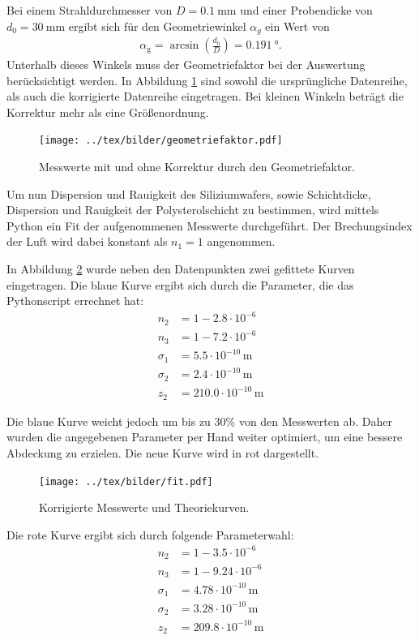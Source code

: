 Bei einem Strahldurchmesser von $D = \SI{0.1}{\milli\meter}$ und einer Probendicke von $d_0 = \SI{30}{\milli\meter}$ ergibt sich für den Geometriewinkel $\alpha_g$ ein Wert von
\begin{align}
	\alpha_\text{g} = \arcsin\left(\frac{d_0}{D}\right) = \SI{0.191}{\degree}.
\end{align}
Unterhalb dieses Winkels muss der Geometriefaktor bei der Auswertung berücksichtigt werden. In Abbildung \ref{pic:geometrie} sind sowohl die ursprüngliche Datenreihe, als auch die korrigierte Datenreihe eingetragen. Bei kleinen Winkeln beträgt die Korrektur mehr als eine Größenordnung.

\begin{figure}[h]
 	\centering
 	\texttt{[image: ../tex/bilder/geometriefaktor.pdf]}
 	\caption{Messwerte mit und ohne Korrektur durch den Geometriefaktor.}
 	\label{pic:geometrie}
\end{figure}


Um nun Dispersion und Rauigkeit des Siliziumwafers, sowie Schichtdicke, Dispersion und Rauigkeit der Polysterolschicht zu bestimmen, wird mittels Python ein Fit der aufgenommenen Messwerte durchgeführt. Der Brechungsindex der Luft wird dabei konstant als $n_1=1$ angenommen.

In Abbildung \ref{pic:fit} wurde neben den Datenpunkten zwei gefittete Kurven eingetragen. Die blaue Kurve ergibt sich durch die Parameter, die das Pythonscript errechnet hat:
\begin{align*}
	n_2 &= 1-2.8\cdot 10^{-6}\\
	n_3 &= 1-7.2\cdot 10^{-6}\\
	\sigma_1 &= 5.5\cdot 10^{-10}\,\si{\meter} \\
	\sigma_2 &= 2.4\cdot 10^{-10}\,\si{\meter}\\
	z_2&= 210.0\cdot 10^{-10}\,\si{\meter}
\end{align*}

Die blaue Kurve weicht jedoch um bis zu 30\% von den Messwerten ab. Daher wurden die angegebenen Parameter per Hand weiter optimiert, um eine bessere Abdeckung zu erzielen. Die neue Kurve wird in rot dargestellt.
\begin{figure}[H]
 	\centering
 	\texttt{[image: ../tex/bilder/fit.pdf]}
 	\caption{Korrigierte Messwerte und Theoriekurven.}
 	\label{pic:fit}
\end{figure}


Die rote Kurve ergibt sich durch folgende Parameterwahl:
\begin{align*}
n_2 &= 1-3.5\cdot 10^{-6}\\
n_3 &= 1-9.24\cdot 10^{-6}\\
\sigma_1 &= 4.78\cdot 10^{-10}\,\si{\meter} \\
\sigma_2 &= 3.28\cdot 10^{-10}\,\si{\meter}\\
 z_2&= 209.8\cdot 10^{-10}\,\si{\meter}
\end{align*}

